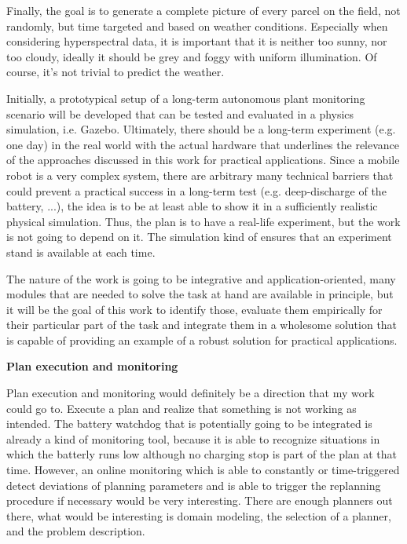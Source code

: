 \documentclass[german, master, expose, latin1]{base/thesis_KBS}
\begin{document}
Finally, the goal is to generate a complete picture of every parcel on the field, not randomly, but time targeted and based on weather conditions. 
Especially when considering hyperspectral data, it is important that it is neither too sunny, nor too cloudy, ideally it should be grey and foggy with uniform illumination.
Of course, it's not trivial to predict the weather.\newline

Initially, a prototypical setup of a long-term autonomous plant monitoring scenario will be developed that can be tested and evaluated 
in a physics simulation, i.e. Gazebo. Ultimately, there should be a long-term experiment (e.g. one day) in the real world with the actual hardware that
underlines the relevance of the approaches discussed in this work for practical applications. Since a mobile robot is a very complex system, there are arbitrary many 
technical barriers that could prevent a practical success in a long-term test (e.g. deep-discharge of the battery, ...), the idea is to be at least able to show 
it in a sufficiently realistic physical simulation. Thus, the plan is to have a real-life experiment, but the work is not going to depend on it.
The simulation kind of ensures that an experiment stand is available at each time.\newline

The nature of the work is going to be integrative and application-oriented, many modules that are needed to solve the task at hand are available in principle, 
but it will be the goal of this work to identify those, evaluate them empirically for their particular part of the task and integrate them in a wholesome 
solution that is capable of providing an example of a robust solution for practical applications.\newline

\textbf{Plan execution and monitoring}\newline

Plan execution and monitoring would definitely be a direction that my work could go to.
Execute a plan and realize that something is not working as intended. The battery watchdog that is potentially going to be integrated is already a kind of monitoring
tool, because it is able to recognize situations in which the batterly runs low although no charging stop is part of the plan at that time.
However, an online monitoring which is able to constantly or time-triggered detect deviations of planning parameters and is able to trigger the replanning procedure
if necessary would be very interesting.\newline
There are enough planners out there, what would be interesting is domain modeling, the selection of a planner, and the problem description.\newline
\end{document}
